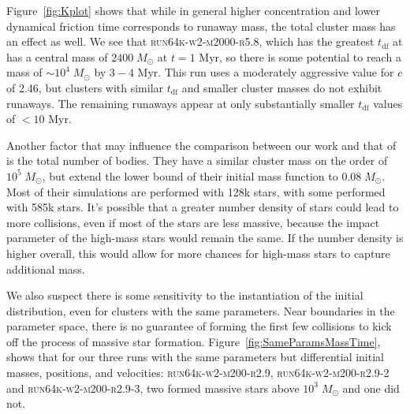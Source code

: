 \documentclass{princeton_astro_thesis}
\newcommand\Msun{\; M_\odot}
\newcommand\Myr{\mbox{ Myr}}
\numberwithin{equation}{section}
\begin{document}
Figure~\ref{fig:Kplot} shows that while in general higher concentration and lower dynamical friction time corresponds to runaway mass, the total cluster mass has an effect as well. We see that \textsc{run64k-w2-m2000-r5.8}, which has the greatest $t_{\mathrm{df}}$ at  has a central mass of $2400 \Msun$ at $t = 1 \Myr$, so there is some potential to reach a mass of $\sim 10^4 \Msun$ by $3-4 \Myr$.  This run uses a moderately aggressive value for $c$ of 2.46, but clusters with similar $t_{\mathrm{df}}$ and smaller cluster masses do not exhibit runaways.  The remaining runaways appear at only substantially smaller $t_{\mathrm{df}}$ values of $< 10 \Myr$.

Another factor that may influence the comparison between our work and that of \citet{2004SPZ} is the total number of bodies. They have a similar cluster mass on the order of $10^{5} \Msun$, but extend the lower bound of their initial mass function to $0.08 \Msun$.  Most of their simulations are performed with 128k stars, with some performed with 585k stars.  It's possible that a greater number density of stars could lead to more collisions, even if most of the stars are less massive, because the impact parameter of the high-mass stars would remain the same. If the number density is higher overall, this would allow for more chances for high-mass stars to capture additional mass.

We also suspect there is some sensitivity to the instantiation of the initial distribution, even for clusters with the same parameters. Near boundaries in the parameter space, there is no guarantee of forming the first few collisions to kick off the process of massive star formation. Figure~\ref{fig:SameParamsMassTime}, shows that for our three runs with the same parameters but differential initial masses, positions, and velocities: \textsc{run64k-w2-m200-r2.9, run64k-w2-m200-r2.9-2} and \textsc{run64k-w2-m200-r2.9-3}, two formed massive stars above $10^3 \Msun$ and one did not.
\end{document}
